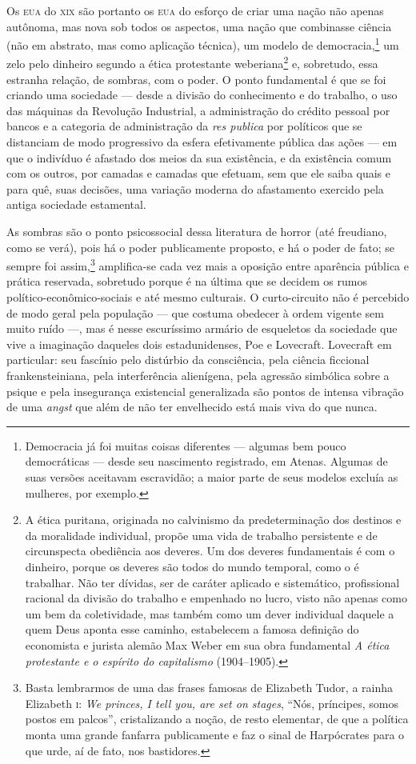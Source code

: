 Os \textsc{eua} do \textsc{xix} são portanto os \textsc{eua} do esforço de criar uma nação não
apenas autônoma, mas nova sob todos os aspectos, uma nação que
combinasse ciência (não em abstrato, mas como aplicação técnica),
um modelo de democracia,\footnote{Democracia já foi muitas coisas
  diferentes --- algumas bem pouco democráticas --- desde seu nascimento
  registrado, em Atenas. Algumas de suas versões aceitavam escravidão; a
  maior parte de seus modelos excluía as mulheres, por exemplo.} um
zelo pelo dinheiro segundo a ética protestante weberiana\footnote{A
  ética puritana, originada no calvinismo da predeterminação dos
  destinos e da moralidade individual, propõe uma vida de trabalho
  persistente e de circunspecta obediência aos deveres. Um dos deveres
  fundamentais é com o dinheiro, porque os deveres são todos do mundo
  temporal, como o é trabalhar. Não ter dívidas, ser de caráter aplicado
  e sistemático, profissional racional da divisão do trabalho e
  empenhado no lucro, visto não apenas como um bem da
  coletividade, mas também como um dever individual daquele a
  quem Deus aponta esse caminho, estabelecem a famosa definição do
  economista e jurista alemão Max Weber em sua obra
  fundamental \emph{A ética protestante e o espírito do capitalismo}
  (1904--1905).} e, sobretudo, essa estranha relação, de sombras, com o
poder. O ponto fundamental é que se foi criando uma sociedade --- desde
a divisão do conhecimento e do trabalho, o uso das máquinas da Revolução
Industrial, a administração do crédito pessoal por bancos e a categoria
de administração da \emph{res publica} por políticos que se distanciam
de modo progressivo da esfera efetivamente pública das ações --- em que
o indivíduo é afastado dos meios da sua existência, e da existência
comum com os outros, por camadas e camadas que efetuam, sem que
ele saiba quais e para quê, suas decisões, uma variação moderna do
afastamento exercido pela antiga sociedade estamental.

As sombras são o ponto psicossocial dessa literatura de horror (até
freudiano, como se verá), pois há o poder publicamente proposto, e há o
poder de fato; se sempre foi assim,\footnote{Basta lembrarmos de
  uma das frases famosas de Elizabeth Tudor, a rainha
  Elizabeth \textsc{i}: \emph{We princes, I tell you, are set on stages}, ``Nós,
  príncipes, somos postos em palcos'', cristalizando a noção, de resto
  elementar, de que a política monta uma grande fanfarra publicamente e
  faz o sinal de Harpócrates para o que urde, aí de fato, nos
  bastidores.} amplifica-se cada vez mais a oposição entre
aparência pública e prática reservada, sobretudo porque é
na última que se decidem os rumos político-econômico-sociais e até mesmo
culturais. O curto-circuito não é percebido de modo geral pela população
--- que costuma obedecer à ordem vigente sem muito ruído ---, mas é
nesse escuríssimo armário de esqueletos da sociedade que vive a
imaginação daqueles dois estadunidenses, Poe e Lovecraft. Lovecraft em
particular: seu fascínio pelo distúrbio da consciência, pela ciência
ficcional frankensteiniana, pela interferência alienígena, pela agressão
simbólica sobre a psique e pela insegurança existencial generalizada são
pontos de intensa vibração de uma \emph{angst} que além de não ter
envelhecido está mais viva do que nunca.

